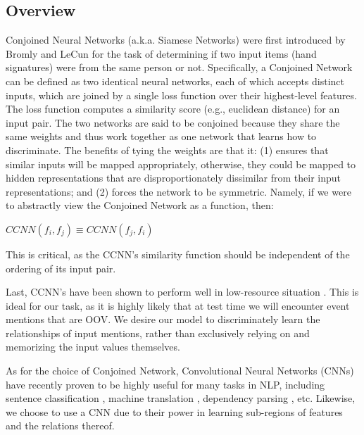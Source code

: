\documentclass[11pt,a4paper]{article}
\begin{document}
\subsection{Overview}
Conjoined Neural Networks (a.k.a. Siamese Networks) were first introduced by Bromly and LeCun  for the task of determining if two input items (hand signatures) were from the same person or not.  Specifically, a Conjoined Network can be defined as two identical neural networks, each of which accepts distinct inputs, which are joined by a single loss function over their highest-level features.  The loss function computes a similarity score (e.g., euclidean distance) for an input pair.  The two networks are said to be conjoined because they share the same weights and thus work together as one network that learns how to discriminate.  The benefits of tying the weights are that it: (1) ensures that similar inputs will be mapped appropriately, otherwise, they could be mapped to hidden representations that are disproportionately dissimilar from their input representations; and (2) forces the network to be symmetric.  Namely, if we were to abstractly view the Conjoined Network as a function, then:

\vspace{4mm}

 $CCNN(f_i,f_j) \equiv CCNN(f_j,f_i)$

\vspace{4mm}

This is critical, as the CCNN's similarity function should be independent of the ordering of its input pair.

Last, CCNN's have been shown to perform well in low-resource situation \cite{Koch2015SiameseNN}.  This is ideal for our task, as it is highly likely that at test time we will encounter event mentions that are OOV.  We desire our model to discriminately learn the relationships of input mentions, rather than exclusively relying on and memorizing the input values themselves.

As for the choice of Conjoined Network, Convolutional Neural Networks (CNNs) have recently proven to be highly useful for many tasks in NLP, including sentence classification \cite{DBLP:conf/emnlp/Kim14}, machine translation \cite{DBLP:conf/acl/GehringAGD17}, dependency parsing \cite{DBLP:journals/corr/YuV17}, etc.  Likewise, we choose to use a CNN due to their power in learning sub-regions of features and the relations thereof.
\end{document}
